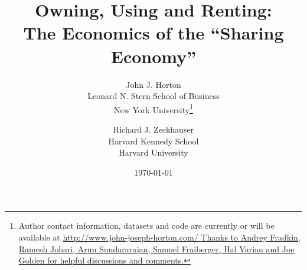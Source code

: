 \documentclass[11pt]{article}
\newcommand{\important}[1]{\textcolor{red}{\textbf{#1}}}
\newcommand{\important}[1]{#1}
\begin{document}
 


\title{Owning, Using and Renting: \\ The Economics of the ``Sharing Economy''} 
\date{\today}

\author{John J. Horton \\ Leonard N. Stern School of Business \\ New
  York University\footnote{Author contact information, datasets and
    code are currently or will be available at
    \href{http://www.john-joseph-horton.com/}{http://www.john-joseph-horton.com/
    Thanks to Andrey Fradkin, Ramesh Johari, Arun Sundararajan, Samuel Fraiberger, Hal Varian and Joe Golden for helpful discussions and comments.}}
  \and 
  Richard J. Zeckhauser \\ Harvard Kennedy School \\ Harvard University
}
\maketitle

\end{document}
